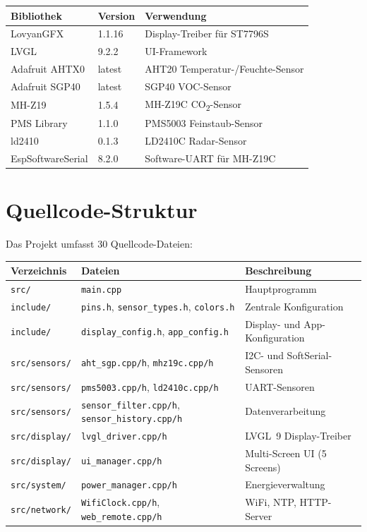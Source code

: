 \documentclass[a4paper,11pt]{article}
\begin{document}
\begin{tabularx}{\textwidth}{llX}
\toprule
\rowcolor{tableheader}
\textbf{Bibliothek} & \textbf{Version} & \textbf{Verwendung} \\
\midrule
LovyanGFX & 1.1.16 & Display-Treiber für ST7796S \\
LVGL & 9.2.2 & UI-Framework \\
Adafruit AHTX0 & latest & AHT20 Temperatur-/Feuchte-Sensor \\
Adafruit SGP40 & latest & SGP40 VOC-Sensor \\
MH-Z19 & 1.5.4 & MH-Z19C CO\textsubscript{2}-Sensor \\
PMS Library & 1.1.0 & PMS5003 Feinstaub-Sensor \\
ld2410 & 0.1.3 & LD2410C Radar-Sensor \\
EspSoftwareSerial & 8.2.0 & Software-UART für MH-Z19C \\
\bottomrule
\end{tabularx}

\section{Quellcode-Struktur}

Das Projekt umfasst 30 Quellcode-Dateien:

\begin{tabularx}{\textwidth}{llX}
\toprule
\rowcolor{tableheader}
\textbf{Verzeichnis} & \textbf{Dateien} & \textbf{Beschreibung} \\
\midrule
\texttt{src/} & \texttt{main.cpp} & Hauptprogramm \\
\texttt{include/} & \texttt{pins.h}, \texttt{sensor\_types.h}, \texttt{colors.h} & Zentrale Konfiguration \\
\texttt{include/} & \texttt{display\_config.h}, \texttt{app\_config.h} & Display- und App-Konfiguration \\
\texttt{src/sensors/} & \texttt{aht\_sgp.cpp/h}, \texttt{mhz19c.cpp/h} & I2C- und SoftSerial-Sensoren \\
\texttt{src/sensors/} & \texttt{pms5003.cpp/h}, \texttt{ld2410c.cpp/h} & UART-Sensoren \\
\texttt{src/sensors/} & \texttt{sensor\_filter.cpp/h}, \texttt{sensor\_history.cpp/h} & Datenverarbeitung \\
\texttt{src/display/} & \texttt{lvgl\_driver.cpp/h} & LVGL~9 Display-Treiber \\
\texttt{src/display/} & \texttt{ui\_manager.cpp/h} & Multi-Screen UI (5 Screens) \\
\texttt{src/system/} & \texttt{power\_manager.cpp/h} & Energieverwaltung \\
\texttt{src/network/} & \texttt{WifiClock.cpp/h}, \texttt{web\_remote.cpp/h} & WiFi, NTP, HTTP-Server \\
\bottomrule
\end{tabularx}
\end{document}
